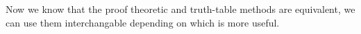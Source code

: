 Now we know that the proof theoretic and truth-table methods are equivalent, we can use them interchangable depending on which is more useful. 

%
%
%
% 
%
    
